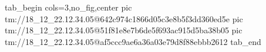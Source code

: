  
 
 
 
 

\qqSecCmtScr


\ifcmt
  tab_begin cols=3,no_fig,center
    pic tm://18_12_22.12.34.05@642c974c1866d05c3e8b5f3dd360ed5e
    pic tm://18_12_22.12.34.05@51f81e8e7b6de5f693ac915d5ba38b05
    pic tm://18_12_22.12.34.05@af5ccc9ae6a36a03e79d8f88ebbb2612
  tab_end
\fi

